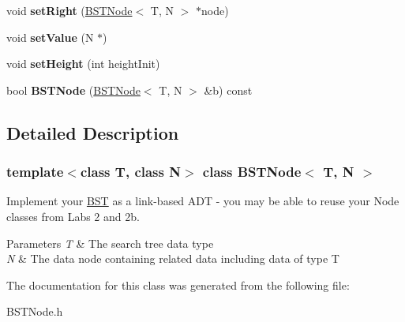 \begin{DoxyCompactItemize}
void {\bfseries set\+Right} (\hyperlink{class_b_s_t_node}{B\+S\+T\+Node}$<$ T, N $>$ $\ast$node)
\item 
\mbox{\label{class_b_s_t_node_a93176c497f9ab7faf5b0580302e60c1a}} 
void {\bfseries set\+Value} (N $\ast$)
\item 
\mbox{\label{class_b_s_t_node_a0c44071e8e168fb84610c28896e366c8}} 
void {\bfseries set\+Height} (int height\+Init)
\item 
\mbox{\label{class_b_s_t_node_a7f88234dccaf2062298245606ea5665b}} 
bool {\bfseries B\+S\+T\+Node} (\hyperlink{class_b_s_t_node}{B\+S\+T\+Node}$<$ T, N $>$ \&b) const
\end{DoxyCompactItemize}


\subsection{Detailed Description}
\subsubsection*{template$<$class T, class N$>$\newline
class B\+S\+T\+Node$<$ T, N $>$}

Implement your \hyperlink{class_b_s_t}{B\+ST} as a link-\/based A\+DT -\/ you may be able to reuse your Node classes from Labs 2 and 2b. 
\begin{DoxyParams}{Parameters}
{\em T} & The search tree data type \\
\hline
{\em N} & The data node containing related data including data of type T \\
\hline
\end{DoxyParams}


The documentation for this class was generated from the following file\+:\begin{DoxyCompactItemize}
\item 
B\+S\+T\+Node.\+h\end{DoxyCompactItemize}
